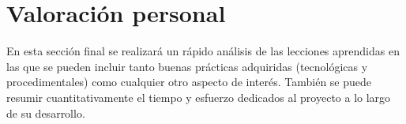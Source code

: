 \section{Valoración personal}
En esta sección final se realizará un rápido análisis de las lecciones aprendidas en las que se pueden incluir tanto buenas prácticas adquiridas (tecnológicas y procedimentales) como cualquier otro aspecto de interés. También se puede resumir cuantitativamente el tiempo y esfuerzo dedicados al proyecto a lo largo de su desarrollo.







